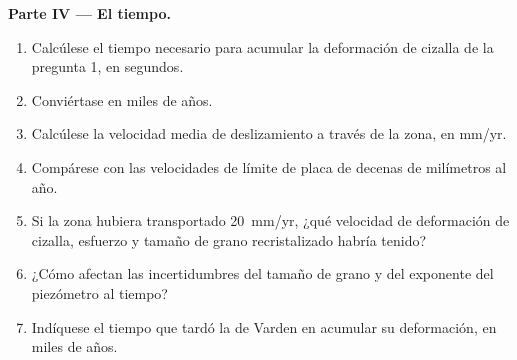 \begin{problem}
\medskip\noindent\textbf{Parte IV --- El tiempo.}
\begin{enumerate}[resume]
  \item Calcúlese el tiempo necesario para acumular la deformación de cizalla de la pregunta 1,
        en segundos.
  \item Conviértase en miles de años.
  \item Calcúlese la velocidad media de deslizamiento a través de la zona, en \unit{mm/yr}.
  \item Compárese con las velocidades de límite de placa de decenas de milímetros al año.
  \item Si la zona hubiera transportado \qty{20}{mm/yr}, ¿qué velocidad de deformación de cizalla, esfuerzo
        y tamaño de grano recristalizado habría tenido?
  \item ¿Cómo afectan las incertidumbres del tamaño de grano y del exponente del
        piezómetro al tiempo?
  \item Indíquese el tiempo que tardó la  de Varden en acumular su deformación, en
        miles de años.
\end{enumerate}
\end{problem}
